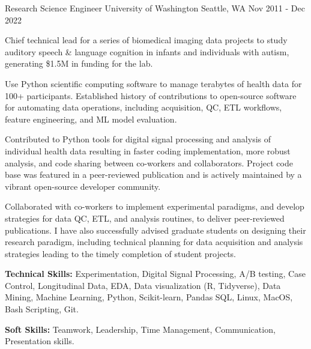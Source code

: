 

\begin{cventries}

  \cventry
  {Research Science Engineer} %
  {University of Washington} %
  {Seattle, WA} %
  {Nov 2011 - Dec 2022} %
  {
    \begin{cvitems} %
      \item {Chief technical lead for a series of biomedical imaging data projects to study auditory speech \& language cognition in infants and individuals with autism, generating \$1.5M in funding for the lab.}
      \item {Use Python scientific computing software to manage terabytes of health data for 100+ participants. Established history of contributions to open-source software for automating data operations, including acquisition, QC, ETL workflows, feature engineering, and ML model evaluation.}
      \item {Contributed to Python tools for digital signal processing and analysis of individual health data resulting in faster coding implementation, more robust analysis, and code sharing between co-workers and collaborators. Project code base was featured in a peer-reviewed publication and is actively maintained by a vibrant open-source developer community.}
      \item {Collaborated with co-workers to implement experimental paradigms, and develop strategies for data QC, ETL, and analysis routines, to deliver peer-reviewed publications. I have also successfully advised graduate students on designing their research paradigm, including technical planning for data acquisition and analysis strategies leading to the timely completion of student projects.}
      \item {\textbf{Technical Skills:} Experimentation, Digital Signal Processing, A/B testing, Case Control, Longitudinal Data, EDA, Data visualization (R, Tidyverse), Data Mining, Machine Learning, Python, Scikit-learn, Pandas SQL, Linux, MacOS, Bash Scripting, Git.}
      \item {\textbf{Soft Skills:} Teamwork, Leadership, Time Management, Communication, Presentation skills.}
    \end{cvitems}
  }


\end{cventries}
